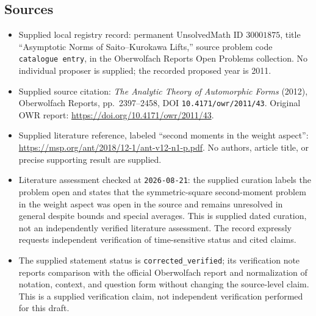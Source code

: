 \documentclass[11pt]{article}
\begin{document}
\subsection{Sources}
\begin{itemize}
\item Supplied local registry record: permanent UnsolvedMath ID \(30001875\), title ``Asymptotic Norms of Saito--Kurokawa Lifts,'' source problem code \texttt{catalogue entry}, in the Oberwolfach Reports Open Problems collection. No individual proposer is supplied; the recorded proposed year is 2011.
\item Supplied source citation: \emph{The Analytic Theory of Automorphic Forms} (2012), Oberwolfach Reports, pp.\ 2397--2458, DOI \texttt{10.4171/owr/2011/43}. Original OWR report: \url{https://doi.org/10.4171/owr/2011/43}.
\item Supplied literature reference, labeled ``second moments in the weight aspect'': \url{https://msp.org/ant/2018/12-1/ant-v12-n1-p.pdf}. No authors, article title, or precise supporting result are supplied.
\item Literature assessment checked at \texttt{2026-08-21}: the supplied curation labels the problem open and states that the symmetric-square second-moment problem in the weight aspect was open in the source and remains unresolved in general despite bounds and special averages. This is supplied dated curation, not an independently verified literature assessment. The record expressly requests independent verification of time-sensitive status and cited claims.
\item The supplied statement status is \texttt{corrected\_verified}; its verification note reports comparison with the official Oberwolfach report and normalization of notation, context, and question form without changing the source-level claim. This is a supplied verification claim, not independent verification performed for this draft.
\end{itemize}
\end{document}
